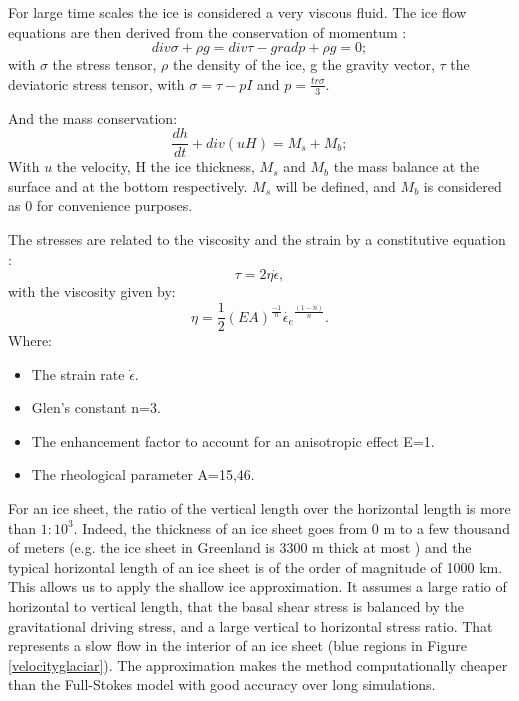 \documentclass{article}
\begin{document}
For large time scales the ice is considered a very viscous fluid. The ice flow equations are then derived from the conservation of momentum \cite{hutter1982mathematical}:
\begin{equation}
	div\sigma + \rho g = div\tau - gradp + \rho g = 0;
\end{equation}
with $\sigma$ the stress tensor, $\rho$ the density of the ice, g the gravity vector, $\tau$ the deviatoric stress tensor, with $\sigma = \tau - pI$ and $p=\frac{tr\sigma}{3}$. 

And the mass conservation:
\begin{equation}
	\frac{dh}{dt}+ div(uH)=M_s + M_b;
\end{equation}
With $u$ the velocity, H the ice thickness, $M_s$ and $M_b$ the mass balance at the surface and at the bottom respectively. $M_s$ will be defined, and $M_b$ is considered as 0 for convenience purposes. 

The stresses are related to the viscosity and the strain by a constitutive equation \cite{glen1958flow}:
\begin{equation}
	\tau = 2\eta\dot{\epsilon},
\end{equation}
with the viscosity given by:
\begin{equation}
	\eta = \frac{1}{2}(EA)^\frac{-1}{n} \dot{\epsilon_e}^\frac{(1-n)}{n}.
\end{equation}
Where:
\begin{itemize}
	\item The strain rate $\dot{\epsilon}$.
	\item Glen's constant n=3.
	\item The enhancement factor to account for an anisotropic effect E=1.
	\item The rheological parameter A=15,46.
\end{itemize}
For an ice sheet, the ratio of the vertical length over the horizontal length is more than $1:10^3$. Indeed, the thickness of an ice sheet goes from 0 m to a few thousand of meters (e.g. the ice sheet in Greenland is 3300 m thick at most \cite[]{bamber2001new}) and the typical horizontal length of an ice sheet is of the order of magnitude of 1000 km. This allows us to apply the shallow ice approximation. It assumes a large ratio of horizontal to vertical length, that the basal shear stress is balanced by  the gravitational driving stress, and a large vertical to horizontal stress ratio. That represents a slow flow in the interior of an ice sheet (blue regions in Figure \ref{velocityglaciar}). The approximation makes the method computationally cheaper than the Full-Stokes model with good accuracy over long simulations.
\end{document}
